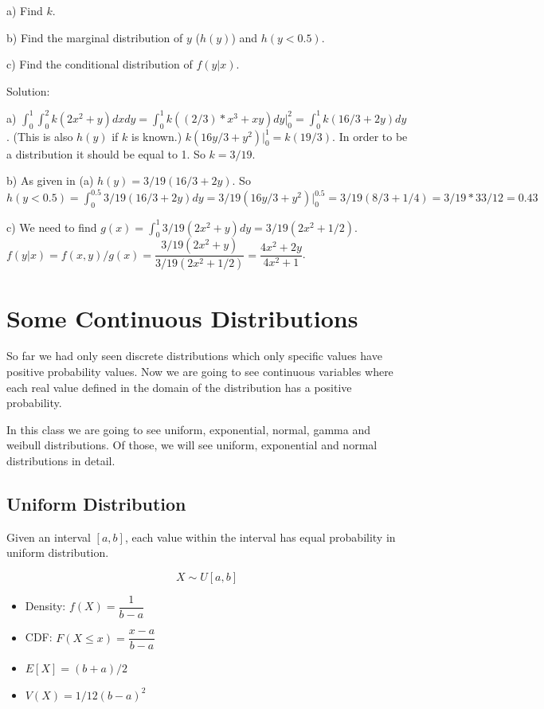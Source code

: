 \documentclass[]{book}
\theoremstyle{definition}
\theoremstyle{definition}
\theoremstyle{definition}
\theoremstyle{remark}
\begin{document}
a) Find \(k\).

b) Find the marginal distribution of \(y\) (\(h(y)\)) and \(h(y<0.5)\).

c) Find the conditional distribution of \(f(y|x)\).

Solution:

a)
\(\int^1_0 \int^2_0 k(2x^2 + y) dx dy = \int^1_0 k((2/3)*x^3 + xy)dy|^2_0 = \int^1_0 k(16/3+2y) dy\).
(This is also \(h(y)\) if \(k\) is known.)
\(k(16y/3+y^2)|^1_0 = k(19/3)\). In order to be a distribution it should
be equal to 1. So \(k = 3/19\).

b) As given in (a) \(h(y) = 3/19(16/3+2y)\). So
\(h(y<0.5) = \int^{0.5}_0 3/19(16/3+2y) dy = 3/19(16y/3+y^2)|^{0.5}_0 = 3/19(8/3 + 1/4) = 3/19*33/12 = 0.43\)

c) We need to find
\(g(x) = \int^1_0 3/19(2x^2 + y)dy = 3/19(2x^2 + 1/2)\).
\(f(y|x) = f(x,y)/g(x) = \dfrac{3/19(2x^2+y)}{3/19(2x^2 + 1/2)} = \dfrac{4x^2 + 2y}{4x^2 + 1}\).

\hypertarget{some-continuous-distributions}{%
\chapter{Some Continuous
Distributions}\label{some-continuous-distributions}}

So far we had only seen discrete distributions which only specific
values have positive probability values. Now we are going to see
continuous variables where each real value defined in the domain of the
distribution has a positive probability.

In this class we are going to see uniform, exponential, normal, gamma
and weibull distributions. Of those, we will see uniform, exponential
and normal distributions in detail.

\hypertarget{uniform-distribution}{%
\section{Uniform Distribution}\label{uniform-distribution}}

Given an interval \([a,b]\), each value within the interval has equal
probability in uniform distribution.

\[X \sim U[a,b]\]

\begin{itemize}
\item
  Density: \(f(X) = \dfrac{1}{b-a}\)
\item
  CDF: \(F(X \le x) = \dfrac{x-a}{b-a}\)
\item
  \(E[X] = (b+a)/2\)
\item
  \(V(X) = 1/12(b-a)^2\)
\end{itemize}
\end{document}
